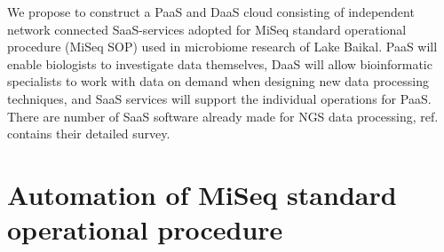 \documentclass[a4paper]{jpconf}
\begin{document}




We propose to construct a PaaS and DaaS cloud consisting of independent network connected SaaS-services adopted for MiSeq standard operational procedure (MiSeq SOP) used in microbiome research of Lake Baikal. PaaS will enable biologists to investigate data themselves, DaaS will allow bioinformatic specialists to work with data on demand when designing new data processing techniques, and SaaS services will support the individual operations for PaaS. There are number of SaaS software already made for NGS data processing, ref.~\cite{guo16} contains their detailed survey. %


\section{Automation of MiSeq standard operational procedure}
\label{sec:sop}
\end{document}
